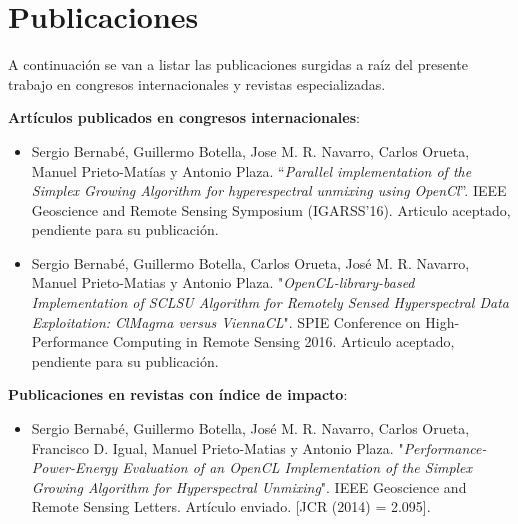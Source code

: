 \newpage
\mbox{}

\chapter{Publicaciones}
\label{publicaciones}

A continuación se van a listar las publicaciones surgidas a raíz del presente trabajo en congresos internacionales y revistas especializadas.

\textbf{Artículos publicados en congresos internacionales}: 
\begin{itemize}
\item Sergio Bernabé, Guillermo Botella, Jose M. R. Navarro, Carlos Orueta, Manuel Prieto-Matías y Antonio Plaza. “\textit{Parallel implementation of the Simplex Growing Algorithm for hyperespectral unmixing using OpenCl}”. IEEE Geoscience and Remote Sensing Symposium (IGARSS'16). Articulo aceptado, pendiente para su publicación. 

\item Sergio Bernabé, Guillermo Botella, Carlos Orueta, José M. R. Navarro, Manuel Prieto-Matias y Antonio Plaza. "\textit{OpenCL-library-based Implementation of SCLSU Algorithm for Remotely Sensed Hyperspectral Data Exploitation: ClMagma versus ViennaCL}". SPIE Conference on High-Performance Computing in Remote Sensing 2016. Articulo aceptado, pendiente para su publicación. 
\end{itemize}

\textbf{Publicaciones en revistas con índice de impacto}:
\begin{itemize}
\item Sergio Bernabé, Guillermo Botella, José M. R. Navarro, Carlos Orueta, Francisco D. Igual, Manuel Prieto-Matias y Antonio Plaza. "\textit{Performance-Power-Energy Evaluation of an OpenCL Implementation of the Simplex Growing Algorithm for Hyperspectral Unmixing}". IEEE Geoscience and Remote Sensing Letters. Artículo enviado. [JCR (2014) = 2.095].
\end{itemize}

